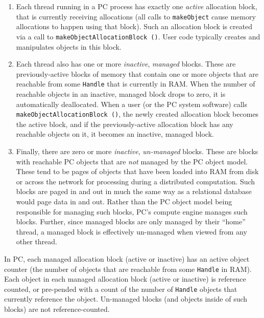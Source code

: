 \begin{enumerate}

\item Each thread running in a PC process has exactly one \emph{active} allocation block, that is currently receiving allocations (all calls to
\texttt{makeObject} cause memory allocations to happen using that block).  Such an allocation block is created via a call to 
\texttt{makeObjectAllocationBlock ()}.  User code typically creates and manipulates objects in this block.

\item Each thread also has one or more
\emph{inactive}, \emph{managed} blocks.  These are previously-active blocks of memory that contain one or more objects that are reachable
from some \texttt{Handle} that is currently in RAM.  When the number of reachable objects in an inactive, managed block drops to zero, it is automatically
deallocated.
When a user (or the PC system software) calls 
\texttt{makeObjectAllocationBlock ()}, the newly created allocation block becomes the active block, and if the previously-active allocation block has any
reachable objects on it, it becomes an inactive, managed block.

\item Finally, there are zero or more \emph{inactive}, \emph{un-managed} blocks.  These are blocks with reachable PC objects that are \emph{not} managed
by the PC object model.  These tend to be pages of objects that have been loaded into RAM from disk or across the network for processing during a
distributed computation.  Such blocks are paged in and out in much the same way as a relational database would page data in and out.
Rather than the PC object model being responsible for managing such blocks, PC's compute engine manages such blocks.
Further, since managed blocks are only managed by their ``home'' thread, a managed block is effectively un-managed when viewed from
any other thread.

\end{enumerate}

In PC, each managed allocation block (active or inactive) has an active object counter (the number of objects that are reachable
from some \texttt{Handle} in RAM).  Each object in each managed allocation block (active or inactive) is reference counted, or pre-pended with a count of
the number of \texttt{Handle} objects that currently reference the object.  
Un-managed blocks (and objects inside of such blocks) are not reference-counted.

